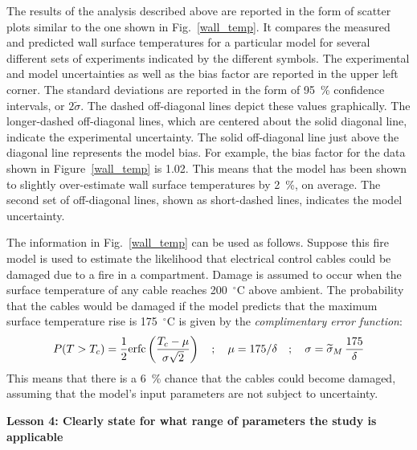 \documentclass[fleqn,b5paper]{article}
\begin{document}
The results of the analysis described above are reported in the form of scatter plots similar to the one shown in Fig.~\ref{wall_temp}. It compares the measured and predicted wall surface temperatures for a particular model for several different sets of experiments indicated by the different symbols. The experimental and model uncertainties as well as the bias factor are reported in the upper left corner. The standard deviations are reported in the form of 95~\% confidence intervals, or $2\widetilde{\sigma}$. The dashed off-diagonal lines depict these values graphically. The longer-dashed off-diagonal lines, which are centered about the solid diagonal line, indicate the experimental uncertainty.  The solid off-diagonal line just above the diagonal line represents the model bias. For example, the bias factor for the data shown in Figure~\ref{wall_temp} is 1.02. This means that the model has been shown to slightly over-estimate wall surface temperatures by 2~\%, on average. The second set of off-diagonal lines, shown as short-dashed lines, indicates the model uncertainty.

The information in Fig.~\ref{wall_temp} can be used as follows. Suppose this fire model is used to estimate the likelihood that electrical control cables could be damaged due to a fire in a compartment. Damage is assumed to occur when the surface temperature of any cable reaches 200~$^\circ$C above ambient. The probability that the cables would be damaged if the model predicts that the maximum surface temperature rise is 175~$^\circ$C is given by the {\em complimentary error function}:
\begin{equation}
   P(T>T_c) = \frac{1}{2} \hbox{erfc} \left( \frac{T_c - \mu}{\sigma \sqrt{2}} \right) \quad ; \quad \mu=175/\delta \quad ; \quad \sigma = \widetilde{\sigma}_M \, \frac{175}{\delta}
\end{equation}
This means that there is a 6~\% chance that the cables could become damaged, assuming that the model's input parameters are not
subject to uncertainty.


\vspace{\parskip}
{\bf Lesson 4: Clearly state for what range of parameters the study is applicable}
\end{document}
